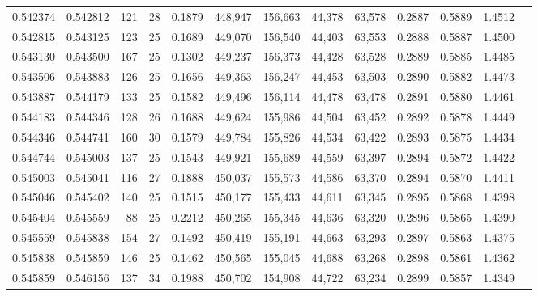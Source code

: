 \begin{tabular}{rrrrrrrrrrrrr}
0.542374 & 0.542812 &   121 &  28 &                                     0.1879 & 448,947 & 156,663 &  44,378 &  63,578 & 0.2887 & 0.5889 & 1.4512 \\
0.542815 & 0.543125 &   123 &  25 &                                     0.1689 & 449,070 & 156,540 &  44,403 &  63,553 & 0.2888 & 0.5887 & 1.4500 \\
0.543130 & 0.543500 &   167 &  25 &                                     0.1302 & 449,237 & 156,373 &  44,428 &  63,528 & 0.2889 & 0.5885 & 1.4485 \\
0.543506 & 0.543883 &   126 &  25 &                                     0.1656 & 449,363 & 156,247 &  44,453 &  63,503 & 0.2890 & 0.5882 & 1.4473 \\
0.543887 & 0.544179 &   133 &  25 &                                     0.1582 & 449,496 & 156,114 &  44,478 &  63,478 & 0.2891 & 0.5880 & 1.4461 \\
0.544183 & 0.544346 &   128 &  26 &                                     0.1688 & 449,624 & 155,986 &  44,504 &  63,452 & 0.2892 & 0.5878 & 1.4449 \\
0.544346 & 0.544741 &   160 &  30 &                                     0.1579 & 449,784 & 155,826 &  44,534 &  63,422 & 0.2893 & 0.5875 & 1.4434 \\
0.544744 & 0.545003 &   137 &  25 &                                     0.1543 & 449,921 & 155,689 &  44,559 &  63,397 & 0.2894 & 0.5872 & 1.4422 \\
0.545003 & 0.545041 &   116 &  27 &                                     0.1888 & 450,037 & 155,573 &  44,586 &  63,370 & 0.2894 & 0.5870 & 1.4411 \\
0.545046 & 0.545402 &   140 &  25 &                                     0.1515 & 450,177 & 155,433 &  44,611 &  63,345 & 0.2895 & 0.5868 & 1.4398 \\
0.545404 & 0.545559 &    88 &  25 &                                     0.2212 & 450,265 & 155,345 &  44,636 &  63,320 & 0.2896 & 0.5865 & 1.4390 \\
0.545559 & 0.545838 &   154 &  27 &                                     0.1492 & 450,419 & 155,191 &  44,663 &  63,293 & 0.2897 & 0.5863 & 1.4375 \\
0.545838 & 0.545859 &   146 &  25 &                                     0.1462 & 450,565 & 155,045 &  44,688 &  63,268 & 0.2898 & 0.5861 & 1.4362 \\
0.545859 & 0.546156 &   137 &  34 &                                     0.1988 & 450,702 & 154,908 &  44,722 &  63,234 & 0.2899 & 0.5857 & 1.4349 \\

\end{tabular}
